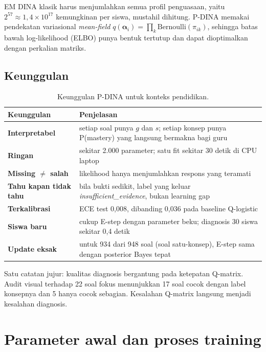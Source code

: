 \documentclass[11pt,a4paper]{article}
\begin{document}
EM DINA klasik harus menjumlahkan semua profil penguasaan, yaitu $2^{57}\approx1{,}4\times10^{17}$ kemungkinan per
siswa, mustahil dihitung. P-DINA memakai pendekatan variasional \emph{mean-field}
$q(\boldsymbol\alpha_i)=\prod_k\mathrm{Bernoulli}(\pi_{ik})$, sehingga batas bawah log-likelihood (ELBO) punya bentuk
tertutup dan dapat dioptimalkan dengan perkalian matriks.

\subsection{Keunggulan}

\begin{table}[h]
  \centering\small
  \begin{tabularx}{\linewidth}{@{}>{\bfseries}l L@{}}
    \toprule
    Keunggulan & Penjelasan \\
    \midrule
    Interpretabel & setiap soal punya $g$ dan $s$; setiap konsep punya P(mastery) yang langsung bermakna bagi guru \\
    Ringan & sekitar 2.000 parameter; satu fit sekitar 30 detik di CPU laptop \\
    Missing $\neq$ salah & likelihood hanya menjumlahkan respons yang teramati \\
    Tahu kapan tidak tahu & bila bukti sedikit, label yang keluar \emph{insufficient\_evidence}, bukan learning gap \\
    Terkalibrasi & ECE test 0,008, dibanding 0,036 pada baseline Q-logistic \\
    Siswa baru & cukup E-step dengan parameter beku; diagnosis 30 siswa sekitar 0,4 detik \\
    Update eksak & untuk 934 dari 948 soal (soal satu-konsep), E-step sama dengan posterior Bayes tepat \\
    \bottomrule
  \end{tabularx}
  \caption{Keunggulan P-DINA untuk konteks pendidikan.}
\end{table}

Satu catatan jujur: kualitas diagnosis bergantung pada ketepatan Q-matrix. Audit visual terhadap 22 soal fokus
menunjukkan 17 soal cocok dengan label konsepnya dan 5 hanya cocok sebagian. Kesalahan Q-matrix langsung menjadi
kesalahan diagnosis.

\section{Parameter awal dan proses training}
\end{document}
